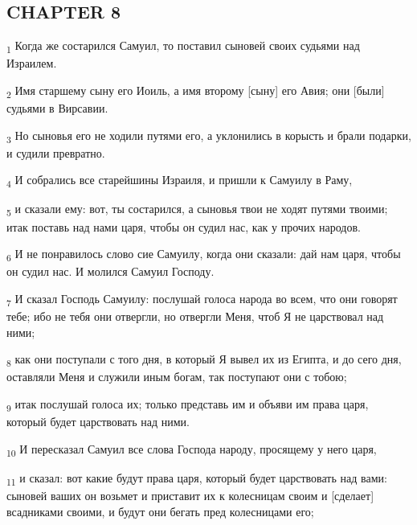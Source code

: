\subsection{CHAPTER 8}
\begin{tcolorbox}
\textsubscript{1} Когда же состарился Самуил, то поставил сыновей своих судьями над Израилем.
\end{tcolorbox}
\begin{tcolorbox}
\textsubscript{2} Имя старшему сыну его Иоиль, а имя второму [сыну] его Авия; они [были] судьями в Вирсавии.
\end{tcolorbox}
\begin{tcolorbox}
\textsubscript{3} Но сыновья его не ходили путями его, а уклонились в корысть и брали подарки, и судили превратно.
\end{tcolorbox}
\begin{tcolorbox}
\textsubscript{4} И собрались все старейшины Израиля, и пришли к Самуилу в Раму,
\end{tcolorbox}
\begin{tcolorbox}
\textsubscript{5} и сказали ему: вот, ты состарился, а сыновья твои не ходят путями твоими; итак поставь над нами царя, чтобы он судил нас, как у прочих народов.
\end{tcolorbox}
\begin{tcolorbox}
\textsubscript{6} И не понравилось слово сие Самуилу, когда они сказали: дай нам царя, чтобы он судил нас. И молился Самуил Господу.
\end{tcolorbox}
\begin{tcolorbox}
\textsubscript{7} И сказал Господь Самуилу: послушай голоса народа во всем, что они говорят тебе; ибо не тебя они отвергли, но отвергли Меня, чтоб Я не царствовал над ними;
\end{tcolorbox}
\begin{tcolorbox}
\textsubscript{8} как они поступали с того дня, в который Я вывел их из Египта, и до сего дня, оставляли Меня и служили иным богам, так поступают они с тобою;
\end{tcolorbox}
\begin{tcolorbox}
\textsubscript{9} итак послушай голоса их; только представь им и объяви им права царя, который будет царствовать над ними.
\end{tcolorbox}
\begin{tcolorbox}
\textsubscript{10} И пересказал Самуил все слова Господа народу, просящему у него царя,
\end{tcolorbox}
\begin{tcolorbox}
\textsubscript{11} и сказал: вот какие будут права царя, который будет царствовать над вами: сыновей ваших он возьмет и приставит их к колесницам своим и [сделает] всадниками своими, и будут они бегать пред колесницами его;
\end{tcolorbox}
